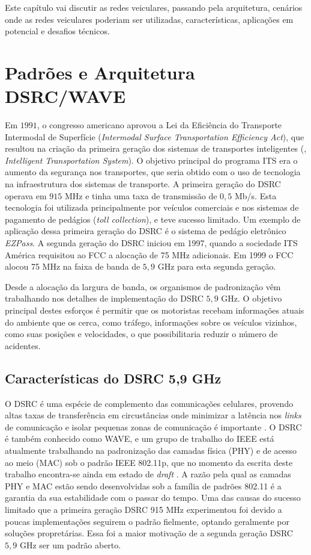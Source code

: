 Este capítulo vai discutir as redes veiculares, passando pela arquitetura,
cenários onde as redes veiculares poderiam ser utilizadas, características,
aplicações em potencial e desafios técnicos.

\section{Padrões e Arquitetura DSRC/WAVE}
Em $1991$, o congresso americano aprovou a Lei da Eficiência do Transporte
Intermodal de Superfície (\textit{Intermodal Surface Transportation
Efficiency Act}), que resultou na criação da primeira geração dos sistemas de
transportes inteligentes (, \textit{Intelligent Transportation
System}). O objetivo principal do programa ITS era o aumento da segurança nos
transportes, que seria obtido com o uso de tecnologia na infraestrutura dos
sistemas de transporte. A primeira geração do DSRC operava em $915$ MHz e tinha
uma taxa de transmissão de $0,5$ Mb/s. Esta tecnologia foi utilizada
principalmente por veículos comerciais e nos sistemas de pagamento de pedágios
(\textit{toll collection}), e teve sucesso limitado. Um exemplo de aplicação
dessa primeira geração do DSRC é o sistema de pedágio eletrônico
\textit{EZPass}. A segunda geração do DSRC iniciou em 1997, quando a sociedade
ITS América requisitou ao FCC a alocação de 75 MHz adicionais. Em 1999 o FCC
alocou 75 MHz na faixa de banda de $5,9$ GHz para esta segunda geração.

Desde a alocação da largura de banda, os organismos de padronização vêm
trabalhando nos detalhes de implementação do DSRC $5,9$ GHz. O objetivo
principal destes esforços é permitir que os motoristas recebam informações
atuais do ambiente que os cerca, como tráfego, informações sobre os veículos
vizinhos, como suas posições e velocidades, o que possibilitaria reduzir
o número de acidentes.

\subsection{Características do DSRC 5,9 GHz}
O DSRC é uma espécie de complemento das comunicações celulares, provendo altas
taxas de transferência em circustâncias onde minimizar a latência nos
\textit{links} de comunicação e isolar pequenas zonas de
comunicação é importante \cite{guo2006vehicular}. O DSRC é também conhecido
como WAVE, e um grupo de trabalho do IEEE está atualmente trabalhando na
padronização das camadas física (PHY) e de acesso ao meio (MAC) sob o padrão
IEEE 802.11p, que no momento da escrita deste trabalho encontra-se ainda em
estado de \textit{draft} \cite{80211p}. A razão pela qual as
camadas PHY e MAC estão sendo desenvolvidas sob a família de padrões 802.11 é a
garantia da sua estabilidade com o passar do tempo. Uma das causas do sucesso
limitado que a primeira geração DSRC 915 MHz experimentou foi devido a poucas
implementações seguirem o padrão fielmente, optando geralmente por soluções
propretárias. Essa foi a maior motivação de a segunda geração DSRC $5,9$ GHz
ser um padrão aberto.

